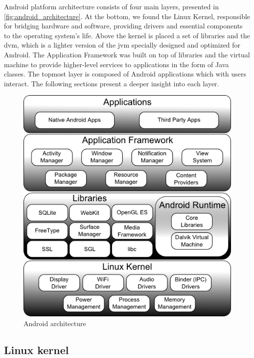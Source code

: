 Android platform architecture consists of four main layers, presented in \autoref{fig:android_architecture}. At the bottom, we found the Linux Kernel, responsible for bridging hardware and software, providing drivers and essential components to the operating system's life. Above the kernel is placed a set of libraries and the \gls{dvm}, which is a lighter version of the \gls{jvm} specially designed and optimized for Android. The Application Framework was built on top of libraries and the virtual machine to provide higher-level services to applications in the form of Java classes. The topmost layer is composed of Android applications which with users interact. The following sections present a deeper insight into each layer.

\begin{figure}[h]
 \begin{center}
 \includegraphics[scale=0.5]{figures/android_architecture.png}
 \end{center}
 \caption{Android architecture}
 \label{fig:android_architecture}
\end{figure}


\subsection{Linux kernel}

